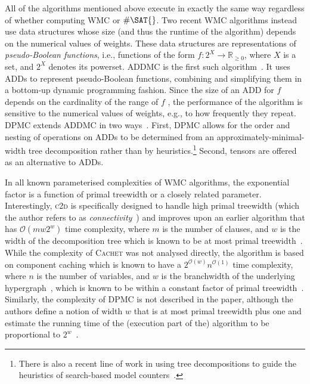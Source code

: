 \documentclass{article}
\theoremstyle{definition}
\begin{document}
All of the algorithms mentioned above execute in exactly the same way regardless of whether computing \textsf{WMC} or $\#\SAT{}$. Two recent \textsf{WMC} algorithms instead use data structures whose size (and thus the runtime of the algorithm) depends on the numerical values of weights. These data structures are representations of \emph{pseudo-Boolean functions}, i.e., functions of the form $f\colon 2^X \to \mathbb{R}_{\ge 0}$, where $X$ is a set, and $2^X$ denotes its powerset. \textsc{ADDMC} is the first such algorithm~\cite{DBLP:conf/aaai/DudekPV20}. It uses ADDs to represent pseudo-Boolean functions, combining and simplifying them in a bottom-up dynamic programming fashion. Since the size of an ADD for $f$ depends on the cardinality of the range of $f$ \cite{DBLP:journals/fmsd/BaharFGHMPS97}, the performance of the algorithm is sensitive to the numerical values of weights, e.g., to how frequently they repeat. \textsc{DPMC} extends \textsc{ADDMC} in two ways~\cite{DBLP:conf/cp/DudekPV20}. First, \textsc{DPMC} allows for the order and nesting of operations on ADDs to be determined from an approximately-minimal-width tree decomposition rather than by heuristics.\footnote{There is also a recent line of work in using tree decompositions to guide the heuristics of search-based model counters~\cite{DBLP:conf/cp/KorhonenJ21}.} Second, tensors are offered as an alternative to ADDs.

In all known parameterised complexities of \textsf{WMC} algorithms, the
exponential factor is a function of primal treewidth or a closely related
parameter. Interestingly, \textsc{c2d} is specifically designed to handle high
primal treewidth (which the author refers to as
\emph{connectivity}~\cite{DBLP:conf/ijcai/Darwiche99}) and improves upon an
earlier algorithm that has $\mathcal{O}(mw2^w)$ time complexity, where $m$ is
the number of clauses, and $w$ is the width of the decomposition tree which is
known to be at most primal
treewidth~\cite{DBLP:journals/jacm/Darwiche01,DBLP:conf/ecai/Darwiche04}. While
the complexity of \textsc{Cachet} was not analysed directly, the algorithm is
based on component caching which is known to have a
$2^{\mathcal{O}(w)}n^{\mathcal{O}(1)}$ time complexity, where $n$ is the number
of variables, and $w$ is the branchwidth of the underlying
hypergraph~\cite{DBLP:journals/jair/BacchusDP09,DBLP:conf/sat/SangBBKP04}, which
is known to be within a constant factor of primal
treewidth~\cite{DBLP:journals/jct/RobertsonS91}. Similarly, the complexity of
\textsf{DPMC} is not described in the paper, although the authors define a
notion of width $w$ that is at most primal treewidth plus one and estimate the
running time of the (execution part of the) algorithm to be proportional to
$2^w$~\cite{DBLP:conf/cp/DudekPV20}.
\end{document}
